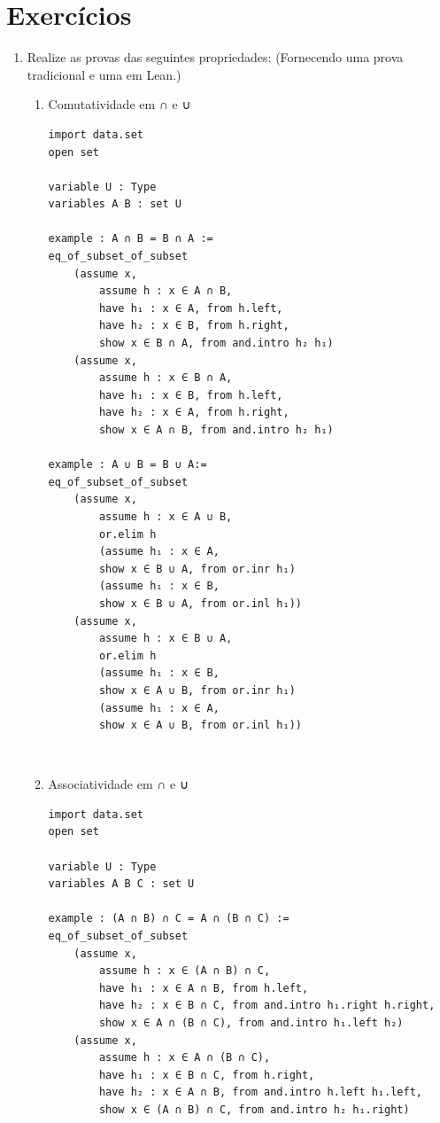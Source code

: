 \section{Exercícios}
\begin{enumerate}

\item Realize as provas das seguintes propriedades: (Fornecendo uma prova tradicional e uma em Lean.)

\begin{enumerate}

\item Comutatividade em ∩ e ∪
\begin{lstlisting}
import data.set
open set

variable U : Type
variables A B : set U

example : A ∩ B = B ∩ A :=
eq_of_subset_of_subset
    (assume x,
        assume h : x ∈ A ∩ B,
        have h₁ : x ∈ A, from h.left,
        have h₂ : x ∈ B, from h.right,
        show x ∈ B ∩ A, from and.intro h₂ h₁)
    (assume x,
        assume h : x ∈ B ∩ A,
        have h₁ : x ∈ B, from h.left,
        have h₂ : x ∈ A, from h.right,
        show x ∈ A ∩ B, from and.intro h₂ h₁)

example : A ∪ B = B ∪ A:=
eq_of_subset_of_subset
    (assume x,
        assume h : x ∈ A ∪ B,
        or.elim h
        (assume h₁ : x ∈ A,
        show x ∈ B ∪ A, from or.inr h₁)
        (assume h₁ : x ∈ B,
        show x ∈ B ∪ A, from or.inl h₁))
    (assume x,
        assume h : x ∈ B ∪ A,
        or.elim h
        (assume h₁ : x ∈ B,
        show x ∈ A ∪ B, from or.inr h₁)
        (assume h₁ : x ∈ A,
        show x ∈ A ∪ B, from or.inl h₁)) \end{lstlisting}

$\qquad$
\item Associatividade em ∩ e ∪
\begin{lstlisting}
import data.set
open set

variable U : Type
variables A B C : set U

example : (A ∩ B) ∩ C = A ∩ (B ∩ C) :=
eq_of_subset_of_subset
    (assume x,
        assume h : x ∈ (A ∩ B) ∩ C,
        have h₁ : x ∈ A ∩ B, from h.left,
        have h₂ : x ∈ B ∩ C, from and.intro h₁.right h.right,
        show x ∈ A ∩ (B ∩ C), from and.intro h₁.left h₂)
    (assume x,
        assume h : x ∈ A ∩ (B ∩ C),
        have h₁ : x ∈ B ∩ C, from h.right,
        have h₂ : x ∈ A ∩ B, from and.intro h.left h₁.left,
        show x ∈ (A ∩ B) ∩ C, from and.intro h₂ h₁.right)


\end{lstlisting}
\end{enumerate}
\end{enumerate}
